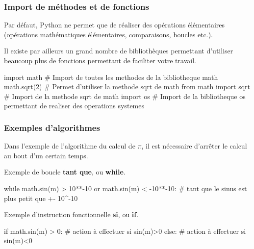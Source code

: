 \begin{frame}[fragile]
\frametitle{Import de méthodes et de fonctions}

Par défaut, Python ne permet que de réaliser des opérations élémentaires (opérations mathématiques élémentaires, comparaisons, boucles etc.).

Il existe par ailleurs un grand nombre de bibliothèques permettant d'utiliser beaucoup plus de fonctions permettant de faciliter votre travail.

\begin{GrayBox}[0.95\textwidth]
\begin{verbatimtab}[3]
import math # Import de toutes les methodes de la bibliotheque math
math.sqrt(2) # Permet d'utiliser la methode sqrt de math
from math import sqrt # Import de la methode sqrt de math
import os # Import de la bibliotheque os permettant
				 de realiser des operations systemes
\end{verbatimtab}
\end{GrayBox}
\end{frame}

\begin{frame}[fragile]
\frametitle{Exemples d'algorithmes}

Dans l'exemple de l'algorithme du calcul de $\pi$, il est nécessaire d'arrêter le calcul au bout d'un certain temps.

Exemple de boucle \textbf{tant que}, ou \textbf{while}.

\begin{GrayBox}[0.75\textwidth]
\begin{verbatimtab}[3]
while math.sin(m) > 10**-10 or math.sin(m) < -10**-10:
	# tant que le sinus est plus petit que +- 10^-10
\end{verbatimtab}
\end{GrayBox}

Exemple d'instruction fonctionnelle \textbf{si}, ou \textbf{if}.

\begin{GrayBox}[0.75\textwidth]
\begin{verbatimtab}[3]
if math.sin(m) > 0:
	# action à effectuer si sin(m)>0
else:
	# action à effectuer si sin(m)<0
\end{verbatimtab}
\end{GrayBox}
\end{frame}



